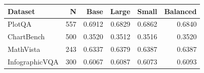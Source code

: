 \begin{tabular}{lrrrrr}
\toprule
Dataset & N & Base & Large & Small & Balanced \\
\midrule
PlotQA & 557 & 0.6912 & 0.6829 & 0.6862 & 0.6840 \\
ChartBench & 500 & 0.3520 & 0.3512 & 0.3516 & 0.3520 \\
MathVista & 243 & 0.6337 & 0.6379 & 0.6387 & 0.6387 \\
InfographicVQA & 300 & 0.6067 & 0.6087 & 0.6073 & 0.6093 \\
\bottomrule
\end{tabular}
